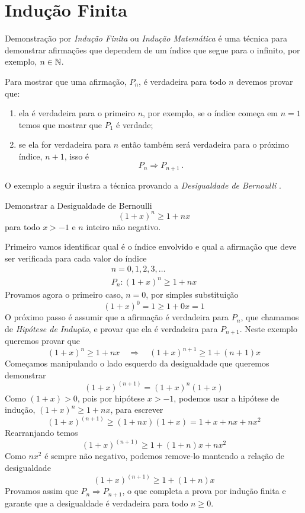 \section{Indução Finita}
\label{sec:Inducao-Finita}

Demonstração por \emph{Indução Finita}
ou
\emph{Indução Matemática}
é uma técnica para demonstrar afirmações que dependem de um índice que segue para
o infinito, por exemplo, $n\in\mathbb{N}$.

Para mostrar que uma afirmação, $P_n$, é verdadeira para todo $n$ devemos provar que:
\begin{enumerate}
	\item ela é verdadeira para o primeiro $n$, por exemplo, se o índice começa em $n=1$
    temos que mostrar que $P_1$ é verdade;
	\item se ela for verdadeira para $n$ então também será verdadeira para o próximo
    índice, $n+1$, isso é
    \[
      P_n \Rightarrow P_{n+1} \,.
    \]
\end{enumerate}

O exemplo a seguir ilustra a técnica provando a
\emph{Desigualdade de Bernoulli}%
%
.

\begin{example}
  \label{ex:Desigualdade_de_Bernoulli}
  Demonstrar a Desigualdade de Bernoulli
  \[
    (1+x)^n \geq 1 + n x
  \]
  para todo $x>-1$ e $n$ inteiro não negativo.

  \solution
  Primeiro vamos identificar qual é o índice envolvido e qual a afirmação
  que deve ser verificada para cada valor do índice
  \begin{gather*}
    n = 0, 1, 2, 3, \dots \\
    P_n\colon (1+x)^n \geq 1 + n x
  \end{gather*}
  Provamos agora o primeiro caso, $n=0$, por simples substituição
  \[
    (1+x)^0 = 1 \geq 1 + 0x = 1
  \]
  O próximo passo é assumir que a afirmação é verdadeira para $P_n$,
  que chamamos de \emph{Hipótese de Indução},
  e provar que ela é verdadeira para $P_{n+1}$.
  Neste exemplo queremos provar que
  \[
    (1+x)^n \geq 1 + nx \quad\Rightarrow\quad (1+x)^{n+1} \geq 1 + (n+1) x
  \]
  Começamos manipulando o lado esquerdo da desigualdade que queremos demonstrar
  \[
    (1+x)^{(n+1)} = (1+x)^{n}(1+x)
  \]
  Como $(1+x)>0$, pois por hipótese $x>-1$, podemos usar a hipótese de indução,
  $(1+x)^n \geq 1 + nx$, para escrever
  \[
    (1+x)^{(n+1)}
    \geq (1 + nx)(1 + x)
    = 1 + x + nx + nx^2
  \]
  Rearranjando temos
  \[
    (1+x)^{(n+1)}
    \geq 1 + (1 + n)x + nx^2
  \]
  Como $nx^2$ é sempre não negativo, podemos remove-lo mantendo a relação de desigualdade
  \[
    (1+x)^{(n+1)}
    \geq 1 + (1 + n)x
  \]
  Provamos assim que $P_n\Rightarrow P_{n+1}$, o que completa a prova por indução finita
  e garante que a desigualdade é verdadeira para todo $n\geq 0$.
\end{example}






